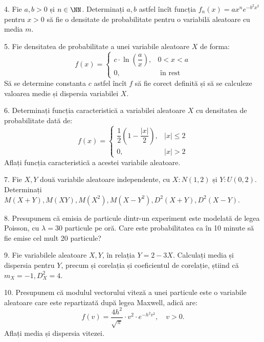 \vspace{0.3cm}

4. Fie $ a, b > 0 $ și $ n \in \NN $. Determinați $ a, b $ astfel încît
funcția $ f_n(x) = ax^n e^{-b^2x^2} $ pentru $ x > 0 $ să fie o densitate
de probabilitate pentru o variabilă aleatoare cu media $ m $.

\vspace{0.3cm}

5. Fie densitatea de probabilitate a unei variabile aleatoare $ X $
de forma:
\[
  f(x) = \begin{cases}
           c \cdot \ln \left(\dfrac{a}{x} \right), & 0 < x < a \\
           0, & \text{ în rest}
           \end{cases}
\]
Să se determine constanta $ c $ astfel încît $ f $ să fie corect
definită și să se calculeze valoarea medie și dispersia variabilei $ X $.

\vspace{0.3cm}

6. Determinați funcția caracteristică a variabilei aleatoare $ X $ cu
densitatea de probabilitate dată de:
\[
  f(x) = \begin{cases}
           \dfrac{1}{2} \left( 1 - \dfrac{|x|}{2} \right), & |x| \leq 2 \\
           0, & |x| > 2
           \end{cases}
\]
Aflați funcția caracteristică a acestei variabile aleatoare.

\vspace{0.3cm}

7. Fie $ X, Y $ două variabile aleatoare independente, cu $ X : N(1, 2) $ și $ Y: U(0, 2) $.
Determinați $ M(X + Y), M(XY), M(X^2), M(X - Y^2), D^2(X + Y), D^2(X - Y) $.

\vspace{0.3cm}

8. Presupunem că emisia de particule dintr-un experiment este modelată
de legea Poisson, cu $ \lambda = 30 $ particule pe oră. Care este
probabilitatea ca în 10 minute să fie emise cel mult 20 particule?

\vspace{0.3cm}

9. Fie variabilele aleatoare $ X, Y $, în relația $ Y = 2 - 3X $.
Calculați media și dispersia pentru $ Y $, precum și corelația și coeficientul
de corelație, știind că $ m_X = -1, D^2_X = 4 $.

\vspace{0.3cm}

10. Presupunem că modulul vectorului viteză a unei particule este o variabile
aleatoare care este repartizată după legea Maxwell, adică are:
\[
  f(v) = \dfrac{4h^2}{\sqrt{\pi}} \cdot v^2 \cdot e^{-h^2 v^2}, \quad v > 0.
\]
Aflați media și dispersia vitezei.